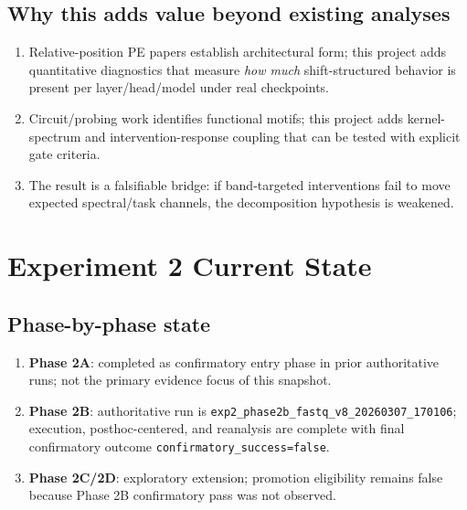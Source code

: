 \documentclass[11pt]{article}
\begin{document}
\subsection*{Why this adds value beyond existing analyses}
\begin{enumerate}[leftmargin=*]
  \item Relative-position PE papers establish architectural form; this project adds quantitative diagnostics that measure \emph{how much} shift-structured behavior is present per layer/head/model under real checkpoints.
  \item Circuit/probing work identifies functional motifs; this project adds kernel-spectrum and intervention-response coupling that can be tested with explicit gate criteria.
  \item The result is a falsifiable bridge: if band-targeted interventions fail to move expected spectral/task channels, the decomposition hypothesis is weakened.
\end{enumerate}

\section{Experiment 2 Current State}
\subsection*{Phase-by-phase state}
\begin{enumerate}[leftmargin=*]
  \item \textbf{Phase 2A}: completed as confirmatory entry phase in prior authoritative runs; not the primary evidence focus of this snapshot.
  \item \textbf{Phase 2B}: authoritative run is \texttt{exp2\_phase2b\_fastq\_v8\_20260307\_170106}; execution, posthoc-centered, and reanalysis are complete with final confirmatory outcome \texttt{confirmatory\_success=false}.
  \item \textbf{Phase 2C/2D}: exploratory extension; promotion eligibility remains false because Phase 2B confirmatory pass was not observed.
\end{enumerate}
\end{document}
